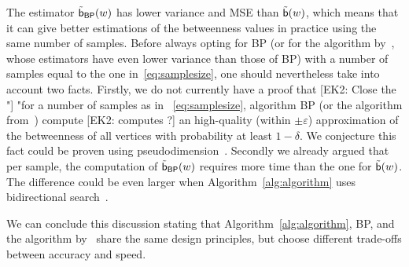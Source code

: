 %
%
%
%

The estimator $\tilde{\mathsf{b}}_{\mathsf{BP}}(w)$ has lower variance and MSE than
$\tilde{\mathsf{b}}(w)$, which means that it can give better estimations of the
betweenness values in practice using the same number of samples. Before always
opting for \textsf{BP} (or for the algorithm by~\citet{GeisbergerSS08}, whose
estimators have even lower variance than those of \textsf{BP}) with a number of
samples equal to the one in~\eqref{eq:samplesize}, one should
nevertheless take into account two facts. Firstly, we do not currently have a
proof that [EK2: Close the "] "for a number of samples as in ~\eqref{eq:samplesize}, algorithm
\textsf{BP} (or the algorithm from~\citep{GeisbergerSS08}) compute [EK2: computes ?] an
high-quality (within $\pm\varepsilon$) approximation of the betweenness of all
vertices with probability at least $1-\delta$. We conjecture this fact could be
proven using pseudodimension~\citep[Chap.~11]{AnthonyB99}. Secondly we already
argued that per sample, the computation of $\tilde{\mathsf{b}}_{\mathsf{BP}}(w)$
requires more time than the one for $\tilde{\mathsf{b}}(w)$. The
difference could be even larger when Algorithm~\ref{alg:algorithm} uses
bidirectional search~\citep{KaindlK97,Pohl69}. 

We can conclude this discussion stating that Algorithm~\ref{alg:algorithm},
\textsf{BP}, and the algorithm by~\citet{GeisbergerSS08} share the same design
principles, but choose different trade-offs between accuracy and speed.  
\fi


